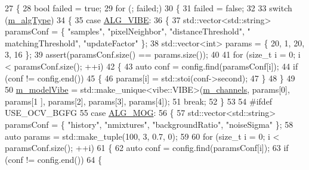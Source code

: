 \begin{DoxyCode}
27 \{
28     \textcolor{keywordtype}{bool} failed = \textcolor{keyword}{true};
29     \textcolor{keywordflow}{for} (; failed;)
30     \{
31         failed = \textcolor{keyword}{false};
32 
33         \textcolor{keywordflow}{switch} (\mbox{\hyperlink{class_background_subtract_a3d569052b6954fa87f04a0aa8a970f97}{m\_algType}})
34         \{
35         \textcolor{keywordflow}{case} \mbox{\hyperlink{class_background_subtract_a56850081696df68b55f87b4f3d87949fa1905f812773a0029b59688e57990f172}{ALG\_VIBE}}:
36         \{
37             std::vector<std::string> paramsConf = \{ \textcolor{stringliteral}{"samples"}, \textcolor{stringliteral}{"pixelNeighbor"}, \textcolor{stringliteral}{"distanceThreshold"}, \textcolor{stringliteral}{"
      matchingThreshold"}, \textcolor{stringliteral}{"updateFactor"} \};
38             std::vector<int> params = \{ 20, 1, 20, 3, 16 \};
39             assert(paramsConf.size() == params.size());
40 
41             \textcolor{keywordflow}{for} (\textcolor{keywordtype}{size\_t} i = 0; i < paramsConf.size(); ++i)
42             \{
43                 \textcolor{keyword}{auto} conf = config.find(paramsConf[i]);
44                 \textcolor{keywordflow}{if} (conf != config.end())
45                 \{
46                     params[i] = std::stoi(conf->second);
47                 \}
48             \}
49 
50             \mbox{\hyperlink{class_background_subtract_a57c251abeed9a2c73a3c97d0f7f8b527}{m\_modelVibe}} = std::make\_unique<vibe::VIBE>(\mbox{\hyperlink{class_background_subtract_a676897a571788e0fee84d568bc68caf0}{m\_channels}}, params[0], params[1
      ], params[2], params[3], params[4]);
51             \textcolor{keywordflow}{break};
52         \}
53 
54 \textcolor{preprocessor}{#ifdef USE\_OCV\_BGFG}
55         \textcolor{keywordflow}{case} \mbox{\hyperlink{class_background_subtract_a56850081696df68b55f87b4f3d87949fa6ce3f5db7dc79642df7c113be3a28d14}{ALG\_MOG}}:
56         \{
57             std::vector<std::string> paramsConf = \{ \textcolor{stringliteral}{"history"}, \textcolor{stringliteral}{"nmixtures"}, \textcolor{stringliteral}{"backgroundRatio"}, \textcolor{stringliteral}{"noiseSigma"}
       \};
58             \textcolor{keyword}{auto} params = std::make\_tuple(100, 3, 0.7, 0);
59 
60             \textcolor{keywordflow}{for} (\textcolor{keywordtype}{size\_t} i = 0; i < paramsConf.size(); ++i)
61             \{
62                 \textcolor{keyword}{auto} conf = config.find(paramsConf[i]);
63                 \textcolor{keywordflow}{if} (conf != config.end())
64                 \{

\end{DoxyCode}
